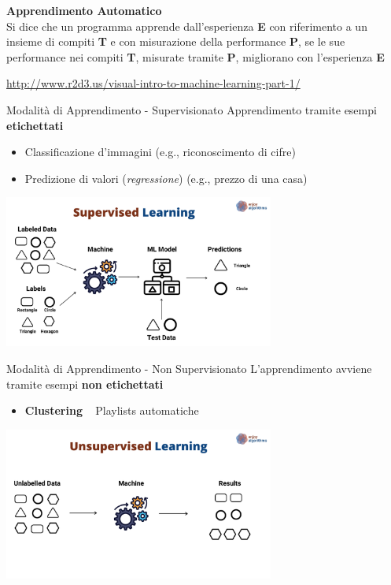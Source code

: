 \documentclass[presentation, 10pt,aspectratio=169]{beamer}\mode<presentation>{\usetheme{AMSBolognaFC}}
\begin{document}
	{

	
	\begin{frame}[c]
		
		{
		\color{customfg}
	
		\begin{center}
		\Large\textbf{Apprendimento Automatico} \\
		\large{
		Si dice che un programma apprende dall’esperienza \textbf{E} con riferimento a un insieme di compiti \textbf{T} e con misurazione della performance \textbf{P}, se le sue performance nei compiti \textbf{T}, misurate tramite \textbf{P}, migliorano con l’esperienza \textbf{E}}
		\end{center}

		\url{http://www.r2d3.us/visual-intro-to-machine-learning-part-1/}
	
		\vspace{1cm}	
	}
\end{frame}
}
\begin{frame}{Modalità di Apprendimento - Supervisionato}
	Apprendimento tramite esempi \textbf{etichettati}
	\begin{itemize}
		\item Classificazione d'immagini (e.g., riconoscimento di cifre)
		\item Predizione di valori (\emph{regressione}) (e.g., prezzo di una casa)
	\end{itemize}
	\centering

	\includegraphics[height=5cm]{img/supervised-learning.png}
\end{frame}

\begin{frame}{Modalità di Apprendimento - Non Supervisionato}
	L'apprendimento avviene tramite esempi \textbf{non etichettati}
	\begin{itemize}
		\item \textbf{Clustering} \faArrowRight ~ Playlists automatiche
	\end{itemize}
	\centering
	\includegraphics[height=5cm]{img/unsupervised-learning.png}
\end{frame}
\end{document}
